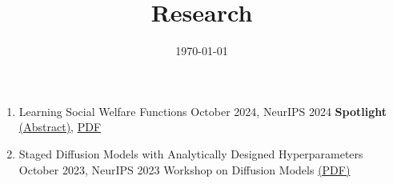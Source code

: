 \documentclass[11pt]{article}
\date{\today}
\title{Research}
\begin{document}
\begin{enumerate}
\item Learning Social Welfare Functions
October 2024, NeurIPS 2024 \textbf{Spotlight}
\href{https://arxiv.org/abs/2405.17700}{(Abstract)}, \href{https://arxiv.org/pdf/2405.17700}{PDF}

\item Staged Diffusion Models with Analytically Designed Hyperparameters
October 2023, NeurIPS 2023 Workshop on Diffusion Models
\href{https://openreview.net/forum?id=veup37U5Bi}{(PDF)}
\end{enumerate}
\end{document}

